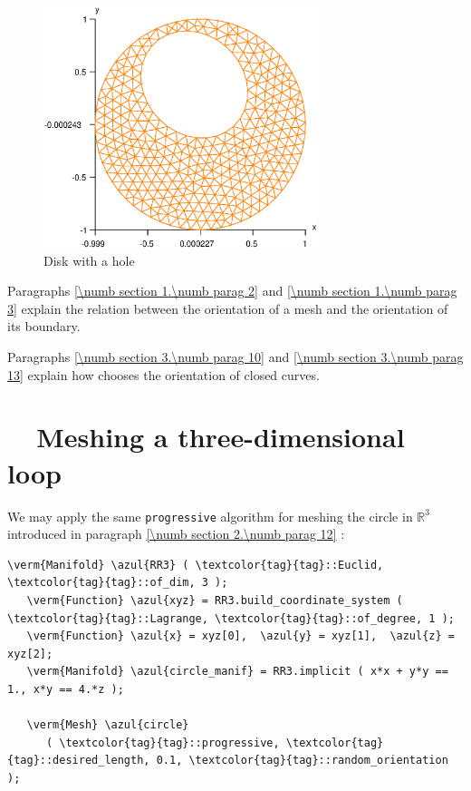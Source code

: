 \begin{figure}[ht] \centering
 \includegraphics[width=80mm]{disk-with-hole}
  \caption{Disk with a hole}
  \label{\numb section 3.\numb fig 2}
\end{figure}

Paragraphs \ref{\numb section 1.\numb parag 2} and \ref{\numb section 1.\numb parag 3} explain
the relation between the orientation of a mesh and the orientation of its boundary.

Paragraphs \ref{\numb section 3.\numb parag 10} and \ref{\numb section 3.\numb parag 13}
explain how {\maniFEM} chooses the orientation of closed curves.


\section{~~Meshing a three-dimensional loop}\label{\numb section 3.\numb parag 4}

We may apply the same {\small\tt progressive} algorithm for meshing the circle in
$ \mathbb{R}^3 $ introduced in paragraph \ref{\numb section 2.\numb parag 12} :

\begin{Verbatim}[commandchars=\\\{\},formatcom=\small\tt,frame=single,
   label=parag-\ref{\numb section 3.\numb parag 4}.cpp,rulecolor=\color{coment},
   baselinestretch=0.94,framesep=2mm                                            ]
   \verm{Manifold} \azul{RR3} ( \textcolor{tag}{tag}::Euclid, \textcolor{tag}{tag}::of_dim, 3 );
   \verm{Function} \azul{xyz} = RR3.build_coordinate_system ( \textcolor{tag}{tag}::Lagrange, \textcolor{tag}{tag}::of_degree, 1 );
   \verm{Function} \azul{x} = xyz[0],  \azul{y} = xyz[1],  \azul{z} = xyz[2];
   \verm{Manifold} \azul{circle_manif} = RR3.implicit ( x*x + y*y == 1., x*y == 4.*z );
   
   \verm{Mesh} \azul{circle}
      ( \textcolor{tag}{tag}::progressive, \textcolor{tag}{tag}::desired_length, 0.1, \textcolor{tag}{tag}::random_orientation );
\end{Verbatim}

